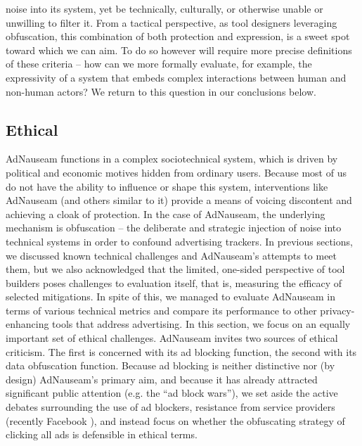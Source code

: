 \documentclass[conference]{IEEEtran}
\begin{document}
noise into its system, yet be technically, culturally, or otherwise unable or unwilling to filter it. From a tactical perspective, as tool designers leveraging obfuscation, this combination of both protection and expression, is a sweet spot toward which we can aim. To do so however will require more precise definitions of these criteria -- how can we more formally evaluate, for example, the expressivity of a system that embeds complex interactions between human and non-human actors? We return to this question in our conclusions below.

\subsection{Ethical}
AdNauseam functions in a complex sociotechnical system, which is driven by political and economic motives hidden from ordinary users. Because most of us do not have the ability to influence or shape this system, interventions like AdNauseam (and others similar to it) provide a means of voicing discontent and achieving a cloak of protection. In the case of AdNauseam, the underlying mechanism is obfuscation -- the deliberate and strategic injection of noise into technical systems in order to confound advertising trackers. In previous sections, we discussed known technical challenges and AdNauseam's attempts to meet them, but we also acknowledged that the limited, one-sided perspective of tool builders poses challenges to evaluation itself, that is, measuring the efficacy of selected mitigations. In spite of this, we managed to evaluate AdNauseam in terms of various technical metrics and compare its performance to other privacy-enhancing tools that address advertising. In this section, we focus on an equally important set of ethical challenges. AdNauseam invites two sources of ethical criticism. The first is concerned with its ad blocking function, the second with its data obfuscation function. Because ad blocking is neither distinctive nor (by design) AdNauseam's primary aim, and because it has already attracted significant public attention (e.g. the ``ad block wars''), we set aside the active debates surrounding the use of ad blockers, resistance from service providers (recently Facebook \cite{Johnston}), and instead focus on whether the obfuscating strategy of clicking all ads is defensible in ethical terms.
\end{document}

